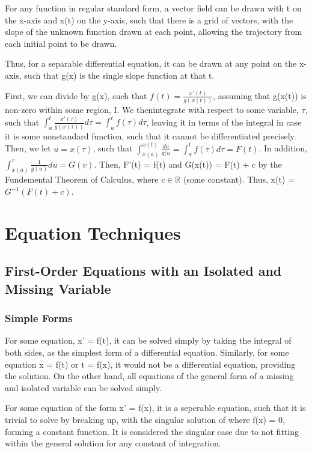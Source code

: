 \documentclass[11 pt, twoside]{article}
\begin{document}
For any function in regular standard form, a vector field can be drawn with t on the x-axis and x(t) on the y-axis, such that there is a grid of vectors, with the slope of the unknown function drawn at each point, allowing the trajectory from each initial point to be drawn.

Thus, for a separable differential equation, it can be drawn at any point on the x-axis, such that g(x) is the single slope function at that t.

First, we can divide by g(x), such that $f(t) = \frac{x'(t)}{g(x(t))}$, assuming that g(x(t)) is non-zero within some region, I. We thenintegrate with respect to some variable, $\tau$, such that $\int^t_a \frac{x'(\tau)}{g(x(\tau))}d\tau = \int^t_a f(\tau)d\tau$, leaving it in terms of the integral in case it is some nonstandard function, such that it cannot be differentiated precisely. Then, we let $u = x(\tau)$, such that $\int^{x(t)}_{x(a)} \frac{du}{g(u} = \int^t_a f(\tau)d\tau = F(t)$. In addition, $\int^v_{x(a)} \frac{1}{g(u)}du = G(v)$. Then, F'(t) = f(t) and G(x(t)) = F(t) + c by the Fundemental Theorem of Calculus, where $c \in \mathbb{R}$ (some constant). Thus, x(t) = $G^{-1}(F(t) + c)$.


\section{Equation Techniques}
\subsection{First-Order Equations with an Isolated and Missing Variable}

\subsubsection*{Simple Forms}
For some equation, x' = f(t), it can be solved simply by taking the integral of both sides, as the simplest form of a differential equation. Similarly, for some equation x = f(t) or t = f(x), it  would not be a differential equation, providing the solution. On the other hand, all equations of the general form of a missing and isolated variable can be solved simply.

For some equation of the form x' = f(x), it is a seperable equation, such that it is trivial to solve by breaking up, with the singular solution of where f(x) = 0, forming a constant function. It is considered the singular case due to not fitting within the general solution for any constant of integration.
\end{document}
